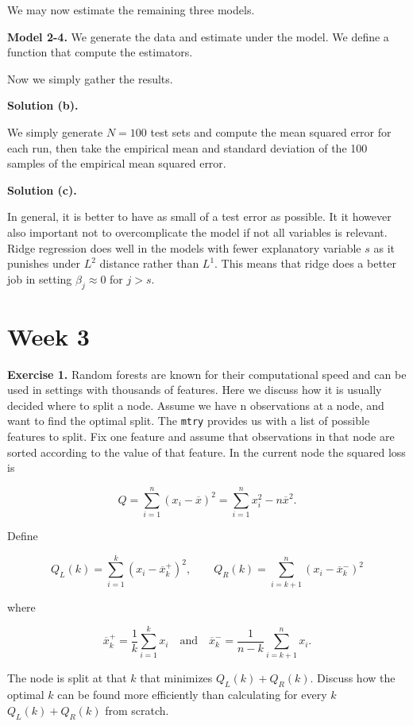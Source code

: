 \documentclass[
]{book}
\begin{document}
We may now estimate the remaining three models.

\textbf{Model 2-4.} We generate the data and estimate under the model. We define a function that compute the estimators.

Now we simply gather the results.

\textbf{Solution (b).}

We simply generate \(N=100\) test sets and compute the mean squared error for each run, then take the empirical mean and standard deviation of the 100 samples of the empirical mean squared error.

\textbf{Solution (c).}

In general, it is better to have as small of a test error as possible. It it however also important not to overcomplicate the model if not all variables is relevant. Ridge regression does well in the models with fewer explanatory variable \(s\) as it punishes under \(L^2\) distance rather than \(L^1\). This means that ridge does a better job in setting \(\beta_j\approx 0\) for \(j> s\).

\hypertarget{week-3-1}{%
\section{Week 3}\label{week-3-1}}

\textbf{Exercise 1.} Random forests are known for their computational speed and can be used in settings with thousands of features. Here we discuss how it is usually decided where to split a node. Assume we have n observations at a node, and want to find the optimal split. The \texttt{mtry} provides us with a list of possible features to split. Fix one feature and assume that observations in that node are sorted according to the value of that feature. In the current node the squared loss is

\[
Q=\sum_{i=1}^n(x_i-\overline x)^2=\sum_{i=1}^nx_i^2-n\overline{x}^2.
\]

Define

\[
Q_L(k)=\sum_{i=1}^k(x_i-\overline{x}_k^+)^2,\qquad Q_R(k)=\sum_{i=k+1}^n(x_i-\overline{x}_k^-)^2
\]

where

\[
\overline{x}_k^+=\frac{1}{k}\sum_{i=1}^kx_i\quad \text{and}\quad \overline{x}_k^-=\frac{1}{n-k}\sum_{i=k+1}^nx_i.
\]

The node is split at that \(k\) that minimizes \(Q_L(k)+Q_R(k)\). Discuss how the optimal \(k\) can be found more efficiently than calculating for every \(k\) \(Q_L(k)+Q_R(k)\) from scratch.
\end{document}
